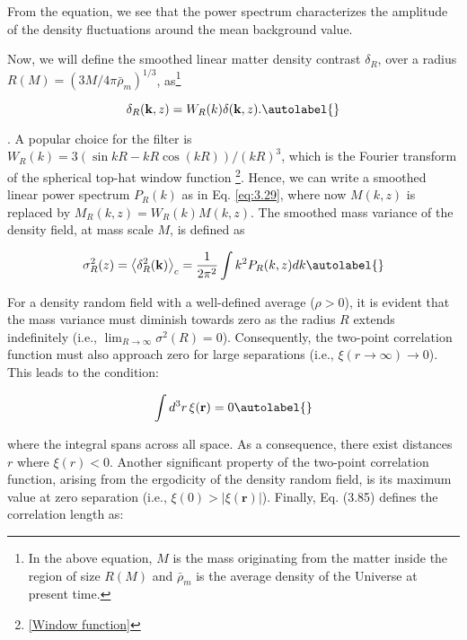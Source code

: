 From the equation, we see that the power spectrum characterizes the amplitude of the density fluctuations around the mean background value.

Now, we will define the smoothed linear matter density contrast $\delta_{R}$, over a radius $R(M)=\left(3 M / 4 \pi \bar{\rho}_{m}\right)^{1 / 3}$, as\footnote{In the above equation, $M$ is the mass originating from the matter inside the region of size $R(M)$ and $\bar{\rho}_{m}$ is the average density of the Universe at present time.}

\begin{equation}
    \delta_{R}(\mathbf{k}, z)=W_{R}(k) \delta(\mathbf{k}, z). \autolabel{}
\end{equation}

. A popular choice for the filter is $W_{R}(k)=3(\sin k R-k R \cos (k R)) /(k R)^{3}$, which is the Fourier transform of the spherical top-hat window function \footnote{\ref{Window function}}. Hence, we can write a smoothed linear power spectrum $P_{R}(k)$ as in Eq. \ref{eq:3.29}, where now $M(k, z)$ is replaced by $M_{R}(k, z)=W_{R}(k) M(k, z)$. The smoothed mass variance of the density field, at mass scale $M$, is defined as

\begin{equation}
    \sigma_{R}^{2}(z)=\left\langle\delta_{R}^{2}(\mathbf{k})\right\rangle_{c}=\frac{1}{2 \pi^{2}} \int k^{2} P_{R}(k, z) d k \autolabel{}
\end{equation}


For a density random field with a well-defined average (\(\rho > 0\)), it is evident that the mass variance must diminish towards zero as the radius \( R \) extends indefinitely (i.e., \( \lim_{R \to \infty} \sigma^2(R) = 0 \)). Consequently, the two-point correlation function must also approach zero for large separations (i.e., \( \xi(r \to \infty) \rightarrow 0 \)). This leads to the condition:

\begin{equation}
    \int d^3 r \, \xi(\mathbf{r}) = 0 \autolabel{}
\end{equation}

where the integral spans across all space. As a consequence, there exist distances \( r \) where \( \xi(r) < 0 \). Another significant property of the two-point correlation function, arising from the ergodicity of the density random field, is its maximum value at zero separation (i.e., \( \xi(0) > |\xi(\mathbf{r})| \)). Finally, Eq. (3.85) defines the correlation length as:

